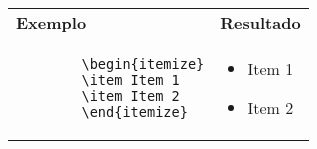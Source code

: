 \begin{quadro}[!htb]
    \centering
    \begin{tabular}{p{7.5cm}|p{7.5cm}}
        \textbf{Exemplo} & \textbf{Resultado} \\
        
        \begin{verbatim}
        \begin{itemize}
        \item Item 1
        \item Item 2
        \end{itemize}
        \end{verbatim} 
        & 
        \begin{itemize}
        \item Item 1
        \item Item 2
        \end{itemize}
        \\
        
    \end{tabular}
\end{quadro}

